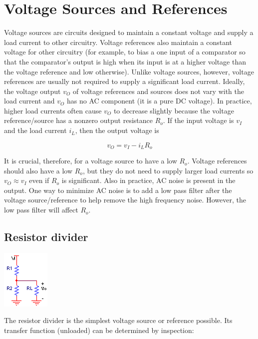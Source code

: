 \chapter{Voltage Sources and References}
Voltage sources are circuits designed to maintain a constant voltage and supply a load current to other circuitry. Voltage references also maintain a constant voltage for other circuitry (for example, to bias a one input of a comparator so that the comparator's output is high when its input is at a higher voltage than the voltage reference and low otherwise). Unlike voltage sources, however, voltage references are usually not required to supply a significant load current. Ideally, the voltage output $v_{O}$ of voltage references and sources does not vary with the load current and $v_{O}$ has no AC component (it is a pure DC voltage). In practice, higher load currents often cause $v_{O}$ to decrease slightly because the voltage reference/source has a nonzero output resistance $R_{o}$. If the input voltage is $v_{I}$ and the load current $i_{L}$, then the output voltage is

\begin{equation}
v_{O} = v_{I} - i_{L}R_{o}
\end{equation}

\noindent It is crucial, therefore, for a voltage source to have a low $R_{o}$. Voltage references should also have a low $R_{o}$, but they do not need to supply larger load currents so $v_{O} \approx v_{I}$ even if $R_{o}$ is significant. Also in practice, AC noise is present in the output. One way to minimize AC noise is to add a low pass filter after the voltage source/reference to help remove the high frequency noise. However, the low pass filter will affect $R_{o}$.
\section{Resistor divider}
\begin{center}
	\includegraphics{schematics/resistordivider.PNG}
\end{center}
The resistor divider is the simplest voltage source or reference possible. Its transfer function (unloaded) can be determined by inspection:

